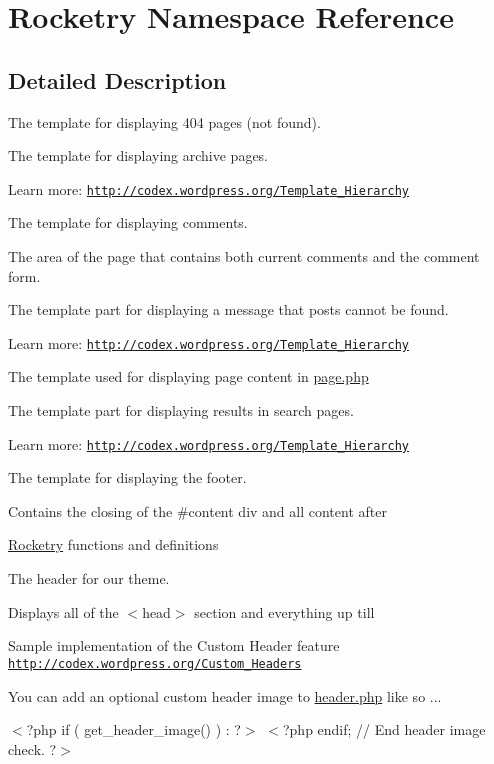 \hypertarget{namespace_rocketry}{}\section{Rocketry Namespace Reference}
\label{namespace_rocketry}


\subsection{Detailed Description}
The template for displaying 404 pages (not found).

The template for displaying archive pages.

Learn more\+: \href{http://codex.wordpress.org/Template_Hierarchy}{\tt http\+://codex.\+wordpress.\+org/\+Template\+\_\+\+Hierarchy}

The template for displaying comments.

The area of the page that contains both current comments and the comment form.

The template part for displaying a message that posts cannot be found.

Learn more\+: \href{http://codex.wordpress.org/Template_Hierarchy}{\tt http\+://codex.\+wordpress.\+org/\+Template\+\_\+\+Hierarchy}

The template used for displaying page content in \hyperlink{page_8php}{page.\+php}

The template part for displaying results in search pages.

Learn more\+: \href{http://codex.wordpress.org/Template_Hierarchy}{\tt http\+://codex.\+wordpress.\+org/\+Template\+\_\+\+Hierarchy}

The template for displaying the footer.

Contains the closing of the \#content div and all content after

\hyperlink{namespace_rocketry}{Rocketry} functions and definitions

The header for our theme.

Displays all of the $<$head$>$ section and everything up till 

Sample implementation of the Custom Header feature \href{http://codex.wordpress.org/Custom_Headers}{\tt http\+://codex.\+wordpress.\+org/\+Custom\+\_\+\+Headers}

You can add an optional custom header image to \hyperlink{header_8php}{header.\+php} like so ...

 $<$?php if ( get\+\_\+header\+\_\+image() ) \+: ?$>$ \href{<?php echo esc_url( home_url( '/' ) ); ?>}{\tt } $<$?php endif; // End header image check. ?$>$

